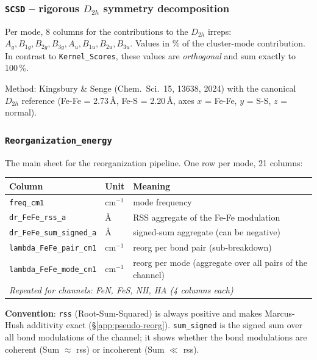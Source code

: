 \documentclass[11pt,a4paper,twoside]{article}
\providecommand{\angstrom}{\text{\AA}}    %
\theoremstyle{remark}
\begin{document}
\subsubsection*{\texttt{SCSD} -- rigorous $D_{2h}$ symmetry decomposition}

Per mode, 8 columns for the contributions to the $D_{2h}$ irreps:
$A_g, B_{1g}, B_{2g}, B_{3g}, A_u, B_{1u}, B_{2u}, B_{3u}$. Values
in \% of the cluster-mode contribution. In contrast to
\texttt{Kernel\_Scores}, these values are \emph{orthogonal} and
sum exactly to 100\,\%.

Method: Kingsbury \& Senge (Chem.\ Sci.\ 15, 13638, 2024) with the
canonical $D_{2h}$ reference (Fe-Fe = 2.73\,$\angstrom$,
Fe-S = 2.20\,$\angstrom$, axes $x$ = Fe-Fe, $y$ = S-S, $z$ = normal).

\subsubsection*{\texttt{Reorganization\_energy}}
\label{app:sheet-reorg}

The main sheet for the reorganization pipeline. One row per mode,
21 columns:

\begin{center}
\small
\begin{tabular}{p{4.0cm}p{1.4cm}p{7.6cm}}
\toprule
\textbf{Column} & \textbf{Unit} & \textbf{Meaning} \\
\midrule
\texttt{freq\_cm1}                  & cm$^{-1}$ & mode frequency \\
\texttt{dr\_FeFe\_rss\_a}           & $\angstrom$ & RSS aggregate of the Fe-Fe modulation \\
\texttt{dr\_FeFe\_sum\_signed\_a}   & $\angstrom$ & signed-sum aggregate (can be negative) \\
\texttt{lambda\_FeFe\_pair\_cm1}    & cm$^{-1}$ & reorg per bond pair (sub-breakdown) \\
\texttt{lambda\_FeFe\_mode\_cm1}    & cm$^{-1}$ & reorg per mode (aggregate over all
                                                 pairs of the channel) \\
\midrule
\multicolumn{3}{l}{\textit{Repeated for channels: FeN, FeS, NH, HA
       (4 columns each)}} \\
\bottomrule
\end{tabular}
\end{center}

\textbf{Convention}: \texttt{rss} (Root-Sum-Squared) is always
positive and makes Marcus-Hush additivity exact
(\S\ref{app:pseudo-reorg}). \texttt{sum\_signed} is the signed sum
over all bond modulations of the channel; it shows whether the
bond modulations are coherent (Sum $\approx$ rss) or incoherent
(Sum $\ll$ rss).
\end{document}
